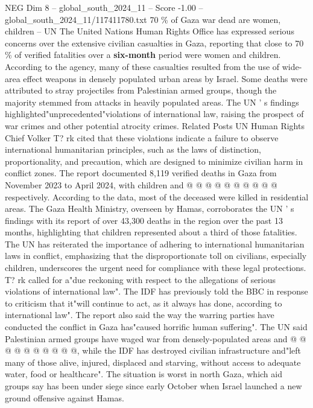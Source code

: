 \begin{textsample}{NEG Dim 8 – global\_south\_2024\_11 – Score -1.00 – global\_south\_2024\_11/117411780.txt}  \label{ex:f8_neg_289}
70 \% of Gaza war dead are women, children -- UN The United Nations Human Rights Office has expressed serious concerns over the extensive civilian casualties in Gaza, reporting that close to 70 \% of verified fatalities over a \textbf{six-month} period were women and children.
According to the agency, many of these casualties resulted from the use of wide-area effect weapons in densely populated urban areas by Israel.
Some deaths were attributed to stray projectiles from Palestinian armed groups, though the majority stemmed from attacks in heavily populated areas.
The UN ' s findings highlighted"unprecedented"violations of international law, raising the prospect of war crimes and other potential atrocity crimes.
Related Posts UN Human Rights Chief Volker T? rk cited that these violations indicate a failure to observe international humanitarian principles, such as the laws of distinction, proportionality, and precaution, which are designed to minimize civilian harm in conflict zones.
The report documented 8,119 verified deaths in Gaza from November 2023 to April 2024, with children and @ @ @ @ @ @ @ @ @ @ respectively.
According to the data, most of the deceased were killed in residential areas.
The Gaza Health Ministry, overseen by Hamas, corroborates the UN ' s findings with its report of over 43,300 deaths in the region over the past 13 months, highlighting that children represented about a third of those fatalities.
The UN has reiterated the importance of adhering to international humanitarian laws in conflict, emphasizing that the disproportionate toll on civilians, especially children, underscores the urgent need for compliance with these legal protections.
T? rk called for a"due reckoning with respect to the allegations of serious violations of international law".
The IDF has previously told the BBC in response to criticism that it"will continue to act, as it always has done, according to international law".
The report also said the way the warring parties have conducted the conflict in Gaza has"caused horrific human suffering".
The UN said Palestinian armed groups have waged war from densely-populated areas and @ @ @ @ @ @ @ @ @ @, while the IDF has destroyed civilian infrastructure and"left many of those alive, injured, displaced and starving, without access to adequate water, food or healthcare".
The situation is worst in north Gaza, which aid groups say has been under siege since early October when Israel launched a new ground offensive against Hamas.

\end{textsample}
